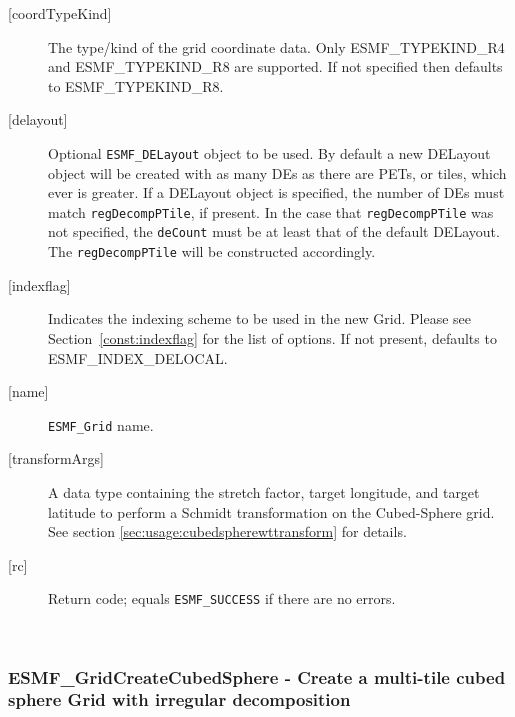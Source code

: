 \begin{description}
       \item[{[coordTypeKind]}]
            The type/kind of the grid coordinate data. Only ESMF\_TYPEKIND\_R4
            and ESMF\_TYPEKIND\_R8 are supported.
            If not specified then defaults to ESMF\_TYPEKIND\_R8.
       \item[{[delayout]}]
            Optional {\tt ESMF\_DELayout} object to be used. By default a new
            DELayout object will be created with as many DEs as there are PETs,
            or tiles, which ever is greater. If a DELayout object is specified,
            the number of DEs must match {\tt regDecompPTile}, if present. In the
            case that {\tt regDecompPTile} was not specified, the {\tt deCount}
            must be at least that of the default DELayout. The
            {\tt regDecompPTile} will be constructed accordingly.
       \item[{[indexflag]}]
            Indicates the indexing scheme to be used in the new Grid. Please see
            Section~\ref{const:indexflag} for the list of options. If not present,
            defaults to ESMF\_INDEX\_DELOCAL.
       \item[{[name]}]
            {\tt ESMF\_Grid} name.
       \item[{[transformArgs]}]
            A data type containing the stretch factor, target longitude, and target latitude
            to perform a Schmidt transformation on the Cubed-Sphere grid. See section
            \ref{sec:usage:cubedspherewttransform} for details.
       \item[{[rc]}]
            Return code; equals {\tt ESMF\_SUCCESS} if there are no errors.
       \end{description}
   
 
\mbox{}\hrulefill\ 
 
\subsubsection [ESMF\_GridCreateCubedSphere] {ESMF\_GridCreateCubedSphere - Create a multi-tile cubed sphere Grid with irregular decomposition}


